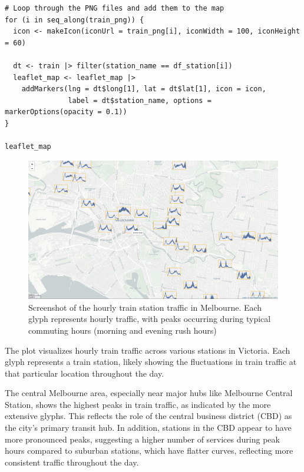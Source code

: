 \begin{verbatim}
# Loop through the PNG files and add them to the map
for (i in seq_along(train_png)) {
  icon <- makeIcon(iconUrl = train_png[i], iconWidth = 100, iconHeight = 60)

  dt <- train |> filter(station_name == df_station[i])
  leaflet_map <- leaflet_map |>
    addMarkers(lng = dt$long[1], lat = dt$lat[1], icon = icon,
               label = dt$station_name, options = markerOptions(opacity = 0.1))
}

leaflet_map
\end{verbatim}

\begin{figure}

{\centering \includegraphics[width=1\linewidth]{figures/leaflet} 

}

\caption{Screenshot of the hourly train station traffic in Melbourne. Each glyph represents hourly traffic, with peaks occurring during typical commuting hours (morning and evening rush hours)}\label{fig:unnamed-chunk-19}
\end{figure}

The plot visualizes hourly train traffic across various stations in Victoria. Each glyph represents a train station, likely showing the fluctuations in train traffic at that particular location throughout the day.

The central Melbourne area, especially near major hubs like Melbourne Central Station, shows the highest peaks in train traffic, as indicated by the more extensive glyphs. This reflects the role of the central business district (CBD) as the city's primary transit hub. In addition, stations in the CBD appear to have more pronounced peaks, suggesting a higher number of services during peak hours compared to suburban stations, which have flatter curves, reflecting more consistent traffic throughout the day.

